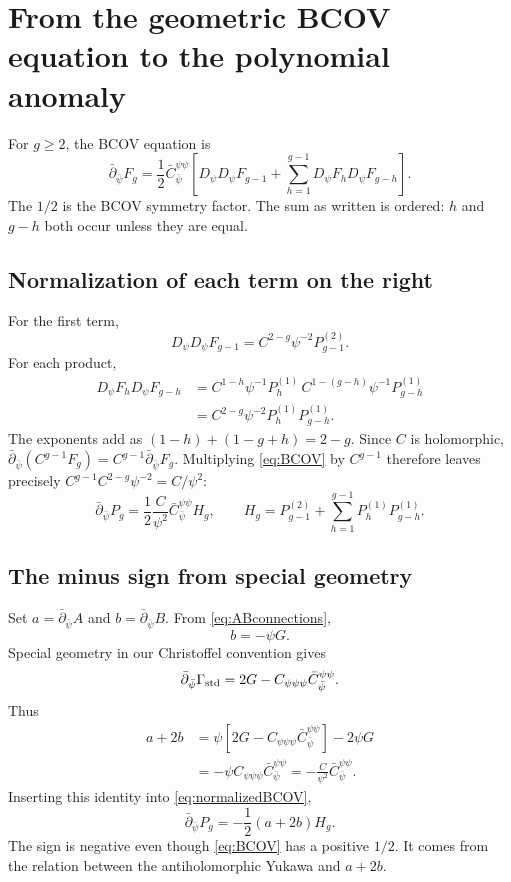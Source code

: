\documentclass[11pt,a4paper]{article}
\numberwithin{equation}{section}
\newcommand{\bdel}{\bar\partial_{\bar\psi}}
\newcommand{\Pg}[2]{P_{#1}^{(#2)}}
\begin{document}
\section{From the geometric BCOV equation to the polynomial anomaly}

For $g\ge2$, the BCOV equation \cite{BCOV} is
\begin{equation}
\bdel F_g=\frac12\bar C_{\bar\psi}^{\psi\psi}
 \left[D_\psi D_\psi F_{g-1}
       +\sum_{h=1}^{g-1}D_\psi F_hD_\psi F_{g-h}\right].
\label{eq:BCOV}
\end{equation}
The $1/2$ is the BCOV symmetry factor. The sum as written is ordered:
$h$ and $g-h$ both occur unless they are equal.

\subsection{Normalization of each term on the right}
For the first term,
\begin{equation}
D_\psi D_\psi F_{g-1}=C^{2-g}\psi^{-2}\Pg{g-1}2.
\end{equation}
For each product,
\begin{align}
D_\psi F_hD_\psi F_{g-h}
 &=C^{1-h}\psi^{-1}\Pg h1\,
   C^{1-(g-h)}\psi^{-1}\Pg{g-h}1\\
 &=C^{2-g}\psi^{-2}\Pg h1\Pg{g-h}1.
\end{align}
The exponents add as $(1-h)+(1-g+h)=2-g$.
Since $C$ is holomorphic, $\bdel(C^{g-1}F_g)=C^{g-1}\bdel F_g$.
Multiplying \eqref{eq:BCOV} by $C^{g-1}$ therefore leaves precisely
$C^{g-1}C^{2-g}\psi^{-2}=C/\psi^2$:
\begin{equation}
\bdel P_g=\frac12\frac C{\psi^2}\bar C_{\bar\psi}^{\psi\psi}H_g,
\qquad
H_g=\Pg{g-1}2+\sum_{h=1}^{g-1}\Pg h1\Pg{g-h}1.
\label{eq:normalizedBCOV}
\end{equation}

\subsection{The minus sign from special geometry}
Set $a=\bdel A$ and $b=\bdel B$. From \eqref{eq:ABconnections},
\begin{equation}
b=-\psi G.
\end{equation}
Special geometry in our Christoffel convention gives
\begin{equation}
\bdel\Gamma_{\rm std}=2G-C_{\psi\psi\psi}\bar C_{\bar\psi}^{\psi\psi}.
\end{equation}
Thus
\begin{align}
a+2b
 &=\psi[2G-C_{\psi\psi\psi}\bar C_{\bar\psi}^{\psi\psi}]-2\psi G\\
 &=-\psi C_{\psi\psi\psi}\bar C_{\bar\psi}^{\psi\psi}
  =-\frac C{\psi^2}\bar C_{\bar\psi}^{\psi\psi}.
\end{align}
Inserting this identity into \eqref{eq:normalizedBCOV},
\begin{equation}\boxed{\bdel P_g=-\frac12(a+2b)H_g.}\label{eq:minus}
\end{equation}
The sign is negative even though \eqref{eq:BCOV} has a positive $1/2$.
It comes from the relation between the antiholomorphic Yukawa and $a+2b$.
\end{document}
